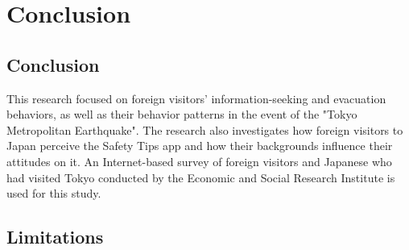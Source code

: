


\chapter{Conclusion}
\section{Conclusion}
This research focused on foreign visitors' information-seeking and evacuation behaviors, as well as their behavior patterns in the event of the "Tokyo Metropolitan Earthquake". The research also investigates how foreign visitors to Japan perceive the Safety Tips app and how their backgrounds influence their attitudes on it. An Internet-based survey of foreign visitors and Japanese who had visited Tokyo conducted by the Economic and Social Research Institute is used for this study. 

\section{Limitations}



















